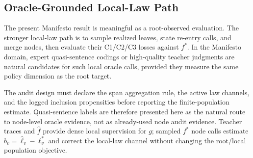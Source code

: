 \subsection{Oracle-Grounded Local-Law Path}

The present Manifesto result is meaningful as a root-observed evaluation. The
stronger local-law path is to sample realized leaves, state re-entry calls,
and merge nodes, then evaluate their C1/C2/C3 losses against \(f^\ast\). In
the Manifesto domain, expert quasi-sentence codings or high-quality teacher
judgments are natural candidates for such local oracle calls, provided they
measure the same policy dimension as the root target.

The audit design must declare the span aggregation rule, the active law
channels, and the logged inclusion propensities before reporting the
finite-population estimate. Quasi-sentence labels are therefore presented here
as the natural route to node-level oracle evidence, not as already-used node
audit evidence. Teacher traces and \(\widehat f\) provide dense local
supervision for \(g\); sampled \(f^\ast\) node calls estimate
\(b_v=\widehat\ell_v-\ell_v^\ast\) and correct the local-law channel without
changing the root/local population objective.
